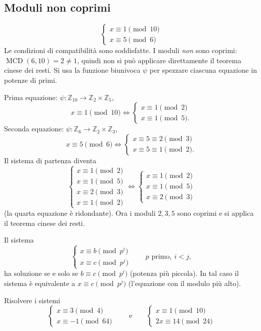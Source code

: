\documentclass[11pt,a4paper]{article}
\begin{document}
\subsection{Moduli non coprimi}

\begin{esempio}
\[
  \begin{cases} x \equiv 1 \pmod{10} \\ x \equiv 5 \pmod 6 \end{cases}
\]
Le condizioni di compatibilità sono soddisfatte. I moduli \emph{non} sono coprimi: $\operatorname{MCD}(6, 10) = 2 \neq 1$, quindi non si può applicare direttamente il teorema cinese dei resti. Si usa la funzione biunivoca $\psi$ per spezzare ciascuna equazione in potenze di primi.

Prima equazione: $\psi : \mathbb{Z}_{10} \to \mathbb{Z}_2\times\mathbb{Z}_5$,
\[
  x \equiv 1 \pmod{10} \iff \begin{cases} x \equiv 1 \pmod 2 \\ x \equiv 1 \pmod 5. \end{cases}
\]
Seconda equazione: $\psi : \mathbb{Z}_6 \to \mathbb{Z}_2\times\mathbb{Z}_3$,
\[
  x \equiv 5 \pmod 6 \iff \begin{cases} x \equiv 5 \equiv 2 \pmod 3 \\ x \equiv 5 \equiv 1 \pmod 2. \end{cases}
\]
Il sistema di partenza diventa
\[
  \begin{cases} x \equiv 1 \pmod 2 \\ x \equiv 1 \pmod 5 \\ x \equiv 2 \pmod 3 \\ x \equiv 1 \pmod 2 \end{cases}
  \iff
  \begin{cases} x \equiv 1 \pmod 2 \\ x \equiv 1 \pmod 5 \\ x \equiv 2 \pmod 3 \end{cases}
\]
(la quarta equazione è ridondante). Ora i moduli $2, 3, 5$ sono coprimi e si applica il teorema cinese dei resti.
\end{esempio}

\begin{osservazione}
Il sistema
\[
  \begin{cases} x \equiv b \pmod{p^i} \\ x \equiv c \pmod{p^j} \end{cases} \qquad p \text{ primo},\ i < j,
\]
ha soluzione se e solo se $b \equiv c \pmod{p^i}$ (potenza più piccola). In tal caso il sistema è equivalente a $x \equiv c \pmod{p^j}$ (l'equazione con il modulo più alto).
\end{osservazione}

\begin{esercizio}
Risolvere i sistemi
\[
  \begin{cases} x \equiv 3 \pmod 4 \\ x \equiv -1 \pmod{64} \end{cases}
  \qquad\text{e}\qquad
  \begin{cases} x \equiv 1 \pmod{10} \\ 2x \equiv 14 \pmod{24} \end{cases}
\]
\end{esercizio}
\end{document}
